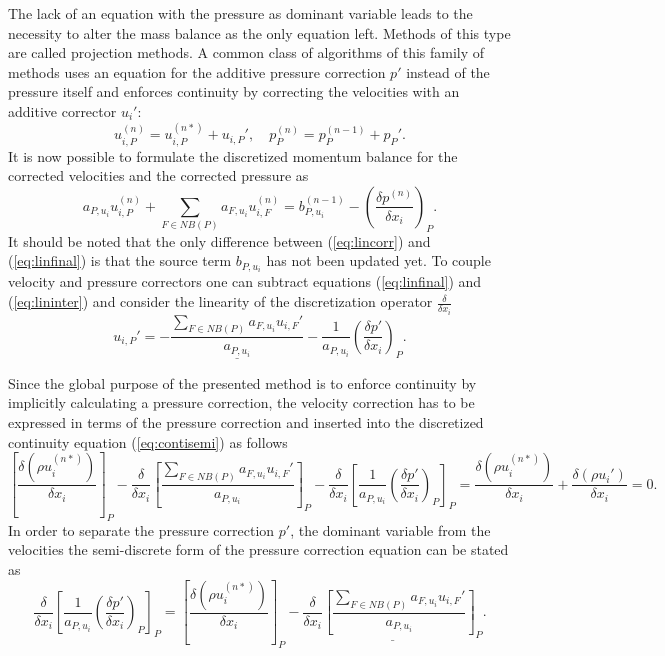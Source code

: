 The lack of an equation with the pressure as dominant variable leads to the necessity to alter the mass balance as the only equation left. Methods of this type are called projection methods. A common class of algorithms of this family of methods uses an equation for the additive pressure correction \(p'\) instead of the pressure itself and enforces continuity by correcting the velocities with an additive corrector \(u_i'\):
  \begin{displaymath}
    u_{i,P}^{(n)} =  u_{i,P}^{(n*)}  + u_{i,P}', \quad   p_P^{(n)} =  p_P^{(n-1)}  + p_P'.
  \end{displaymath}
  It is now possible to formulate the discretized momentum balance for the corrected velocities and the corrected pressure as
  \begin{equation}
    \label{eq:lincorr}
    a_{P,u_i} u_{i,P}^{(n)} + \sum_{F \in NB(P)} a_{F,u_i} u_{i,F}^{(n)} = b_{P,u_i}^{(n-1)} - \left(\frac{\delta p^{(n)}}{\delta x_i}\right)_P.
  \end{equation}
  It should be noted that the only difference between (\ref{eq:lincorr}) and (\ref{eq:linfinal}) is that the source term \(b_{P,u_i}\) has not been updated yet. To couple velocity and pressure correctors one can subtract equations (\ref{eq:linfinal}) and (\ref{eq:lininter}) and consider the linearity of the discretization operator \(\frac{\delta}{\delta x_i}\)
  \begin{equation}
    \label{eq:velcorr}
    u_{i,P}'  =  - \underline{\frac{\sum_{F \in NB(P)} a_{F,u_i} u_{i,F}'}{a_{P,u_i}}} - \frac{1}{a_{P,u_i}}\left(\frac{\delta p'}{\delta x_i}\right)_P.
  \end{equation}

  Since the global purpose of the presented method is to enforce continuity by implicitly calculating a pressure correction, the velocity correction has to be expressed in terms of the pressure correction and inserted into the discretized continuity equation (\ref{eq:contisemi}) as follows
  \begin{equation}
    \left[\frac{\delta \left(\rho u_i^{(n*)}\right)}{\delta x_i} \right]_{P}
  - \frac{\delta}{\delta x_i} \left[ \frac{\sum_{F \in NB(P)} a_{F,u_i} u_{i,F}'}{a_{P,u_i}}\right]_{P}
  - \frac{\delta}{\delta x_i} \left[\frac{1}{a_{P,u_i}}\left(\frac{\delta p'}{\delta x_i}\right)_P\right]_{P}
  =
  \frac{\delta \left(\rho u_i^{(n*)}\right)}{\delta x_i} + \frac{\delta \left(\rho u_i'\right)}{\delta x_i}
  =
  0.
  \end{equation}
  In order to separate the pressure correction \(p'\), the dominant variable from the velocities the semi-discrete form of the pressure correction equation can be stated as
  \begin{equation}
    \label{eq:finalpresscorr}
   \frac{\delta}{\delta x_i} \left[\frac{1}{a_{P,u_i}}\left(\frac{\delta p'}{\delta x_i}\right)_P\right]_{P}
  =
    \left[\frac{\delta \left(\rho u_i^{(n*)}\right)}{\delta x_i} \right]_{P}
    - \underline{\frac{\delta}{\delta x_i} \left[ \frac{\sum_{F \in NB(P)} a_{F,u_i} u_{i,F}'}{a_{P,u_i}}\right]_{P}}.
  \end{equation}
  
